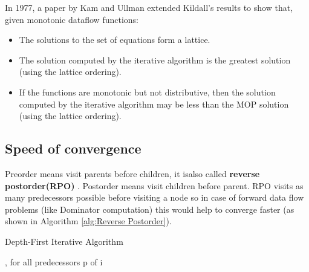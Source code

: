 In 1977, a paper by Kam and Ullman\cite{kam1977monotone}
extended Kildall's results to show that, given monotonic dataflow functions:

\begin{itemize}
	\item The solutions to the set of equations form a lattice.
	\item The solution computed by the iterative algorithm is the greatest solution (using the lattice ordering).
	\item If the functions are monotonic but not distributive, then the solution computed by the iterative algorithm may be less than the MOP solution (using the lattice ordering).
\end{itemize}



\subsection{Speed of convergence}

Preorder means visit parents before children, it isalso called \textbf{reverse postorder(RPO)} . Postorder means visit children before parent.
RPO visits as many predecessors possible before visiting a node so in case of forward data flow problems (like Dominator computation) this would help to converge faster (as shown in Algorithm \ref{alg:Reverse Postorder}).




\begin{algorithm}[H]
	\caption{Depth-First Iterative Algorithm}\label{alg:Reverse Postorder}
	\begin{algorithmic}
		\EndFunction

		\EndFor
		\EndFunction
		\EndFor
		\EndFor
		, for all predecessors p of i
		\EndIf
		\EndFor
		\EndWhile
	\end{algorithmic}
\end{algorithm}


